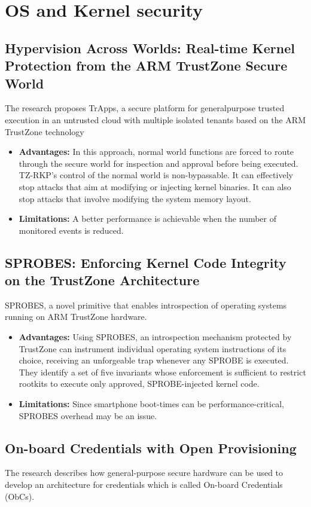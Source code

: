 \documentclass[conference]{IEEEtran}
\begin{document}
\section{OS and Kernel security}

\subsection{Hypervision Across Worlds: Real-time Kernel Protection from the ARM TrustZone Secure World}
\cite{os1} The research proposes TrApps, a secure platform for generalpurpose trusted execution in an untrusted cloud with multiple isolated tenants based on the ARM TrustZone technology

\begin{itemize}
    \item \textbf{Advantages:} In this approach, normal world functions are forced to route through the secure world for inspection and approval before being executed. TZ-RKP’s control of the normal world is non-bypassable. It can effectively stop attacks that aim at modifying or injecting kernel binaries. It can also stop attacks that involve modifying the system memory layout.
    \item \textbf{Limitations:} A better performance is achievable when the number of monitored events is reduced.
\end{itemize}


\subsection{SPROBES: Enforcing Kernel Code Integrity on the TrustZone Architecture}
\cite{os2} SPROBES, a novel primitive that enables introspection of operating systems running on ARM TrustZone hardware.

\begin{itemize}
    \item \textbf{Advantages:} Using SPROBES, an introspection mechanism protected by TrustZone can instrument individual operating system instructions of its choice, receiving an unforgeable trap whenever any SPROBE is executed. They identify a set of five invariants whose enforcement is sufficient to restrict rootkits to execute only approved, SPROBE-injected kernel code.
    \item \textbf{Limitations:} Since smartphone boot-times can be performance-critical, SPROBES overhead may be an issue.
\end{itemize}


\subsection{On-board Credentials with Open Provisioning}
\cite{os3} The research describes how general-purpose secure hardware can be used to develop an architecture for credentials which is called On-board Credentials (ObCs).
\end{document}
